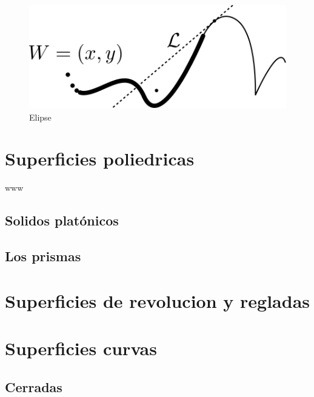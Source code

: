 \documentclass[
  16pt,
]{krantz}
\theoremstyle{definition}
\theoremstyle{definition}
\theoremstyle{definition}
\theoremstyle{definition}
\theoremstyle{remark}
\begin{document}
\begin{figure}[!ht]

{\centering \includegraphics{puntolinea} 

}

\caption{Elipse}\label{fig:pressure1}
\end{figure}

\hypertarget{superficies-poliedricas}{%
\section{Superficies poliedricas}\label{superficies-poliedricas}}

www

\hypertarget{solidos-platuxf3nicos}{%
\subsection{Solidos platónicos}\label{solidos-platuxf3nicos}}

\hypertarget{los-prismas}{%
\subsection{Los prismas}\label{los-prismas}}

\hypertarget{superficies-de-revolucion-y-regladas}{%
\section{Superficies de revolucion y regladas}\label{superficies-de-revolucion-y-regladas}}

\hypertarget{superficies-curvas}{%
\section{Superficies curvas}\label{superficies-curvas}}

\hypertarget{cerradas}{%
\subsection{Cerradas}\label{cerradas}}
\end{document}
